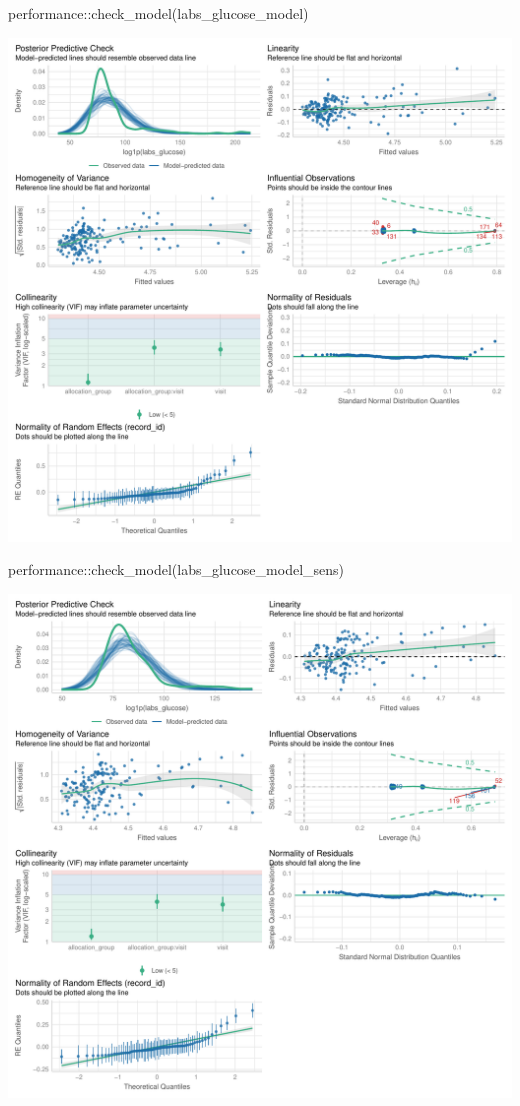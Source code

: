 \documentclass[
  12pt,
]{article}
\newenvironment{Shaded}{\begin{snugshade}}{\end{snugshade}}
\newcommand{\FunctionTok}[1]{\textcolor[rgb]{0.28,0.35,0.67}{#1}}
\newcommand{\NormalTok}[1]{\textcolor[rgb]{0.00,0.23,0.31}{#1}}
\newcommand{\SpecialCharTok}[1]{\textcolor[rgb]{0.37,0.37,0.37}{#1}}
\begin{document}
\begin{Shaded}
\begin{Highlighting}[]
\NormalTok{performance}\SpecialCharTok{::}\FunctionTok{check\_model}\NormalTok{(labs\_glucose\_model)}
\end{Highlighting}
\end{Shaded}

\includegraphics{Outcomes_files/figure-pdf/labs_glucose_4-1.pdf}

\begin{Shaded}
\begin{Highlighting}[]
\NormalTok{performance}\SpecialCharTok{::}\FunctionTok{check\_model}\NormalTok{(labs\_glucose\_model\_sens)}
\end{Highlighting}
\end{Shaded}

\includegraphics{Outcomes_files/figure-pdf/labs_glucose_4-2.pdf}
\end{document}

